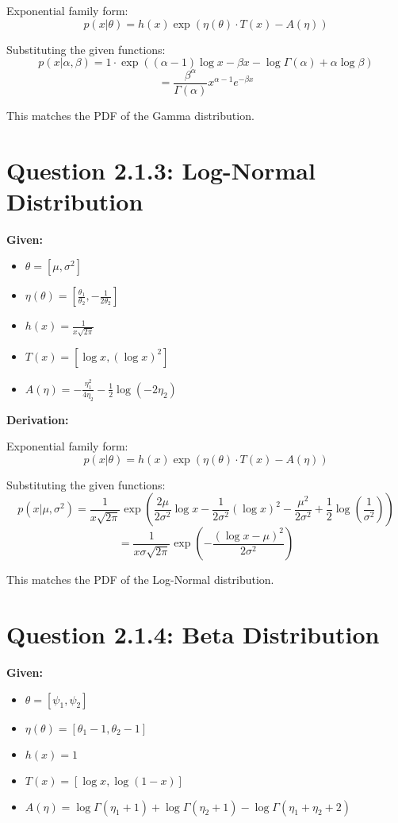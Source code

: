\documentclass{article}
\begin{document}
Exponential family form:
\[
p(x|\theta) = h(x) \exp(\eta(\theta) \cdot T(x) - A(\eta))
\]

Substituting the given functions:
\[
p(x|\alpha, \beta) = 1 \cdot \exp\left((\alpha-1) \log x - \beta x - \log \Gamma(\alpha) + \alpha \log \beta\right)
\]
\[
= \frac{\beta^\alpha}{\Gamma(\alpha)} x^{\alpha-1} e^{-\beta x}
\]

This matches the PDF of the Gamma distribution.

\section*{Question 2.1.3: Log-Normal Distribution}

\textbf{Given:}
\begin{itemize}
    \item \( \theta = [\mu, \sigma^2] \)
    \item \( \eta(\theta) = \left[ \frac{\theta_1}{\theta_2}, -\frac{1}{2\theta_2} \right] \)
    \item \( h(x) = \frac{1}{x\sqrt{2\pi}} \)
    \item \( T(x) = [\log x, (\log x)^2] \)
    \item \( A(\eta) = -\frac{\eta_1^2}{4\eta_2} - \frac{1}{2} \log(-2\eta_2) \)
\end{itemize}

\textbf{Derivation:}

Exponential family form:
\[
p(x|\theta) = h(x) \exp(\eta(\theta) \cdot T(x) - A(\eta))
\]

Substituting the given functions:
\[
p(x|\mu, \sigma^2) = \frac{1}{x\sqrt{2\pi}} \exp\left(\frac{2\mu}{2\sigma^2} \log x - \frac{1}{2\sigma^2} (\log x)^2 - \frac{\mu^2}{2\sigma^2} + \frac{1}{2} \log(\frac{1}{\sigma^2})\right)
\]
\[
= \frac{1}{x\sigma\sqrt{2\pi}} \exp\left(-\frac{(\log x - \mu)^2}{2\sigma^2}\right)
\]

This matches the PDF of the Log-Normal distribution.

\section*{Question 2.1.4: Beta Distribution}

\textbf{Given:}
\begin{itemize}
    \item \( \theta = [\psi_1, \psi_2] \)
    \item \( \eta(\theta) = [\theta_1 - 1, \theta_2 - 1] \)
    \item \( h(x) = 1 \)
    \item \( T(x) = [\log x, \log(1 - x)] \)
    \item \( A(\eta) = \log \Gamma(\eta_1 + 1) + \log \Gamma(\eta_2 + 1) - \log \Gamma(\eta_1 + \eta_2 + 2) \)
\end{itemize}
\end{document}
